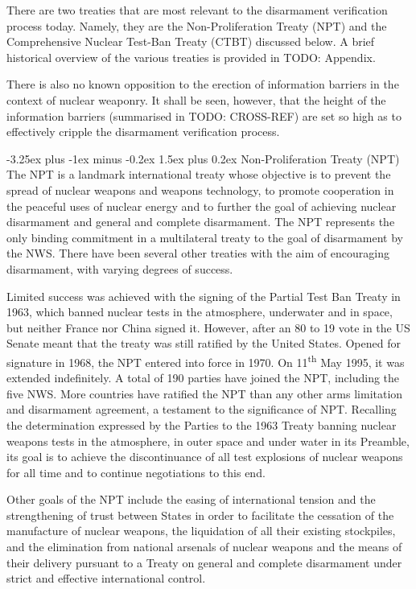 \documentclass[twoside,titlepage,11pt,twocolumn,a4paper]{article}
\makeatletter
\renewcommand{\paragraph}{\@startsection{paragraph}{4}{0ex}%
   {-3.25ex plus -1ex minus -0.2ex}%
   {1.5ex plus 0.2ex}%
   {\normalfont\normalsize\bfseries}}
\makeatother
\begin{document}
There are two treaties that are most relevant to the disarmament
verification process today. Namely, they are the Non-Proliferation
Treaty (NPT) and the Comprehensive Nuclear Test-Ban Treaty (CTBT)
discussed below. A brief historical overview of the various treaties
is provided in TODO: Appendix.

There is also no known opposition to the erection of information
barriers in the context of nuclear weaponry. It shall be seen,
however, that the height of the information barriers (summarised in
TODO: CROSS-REF) are set so high as to effectively cripple the
disarmament verification process.

\paragraph{Non-Proliferation Treaty (NPT)}
The NPT is a landmark international treaty whose objective is to
prevent the spread of nuclear weapons and weapons technology, to
promote cooperation in the peaceful uses of nuclear energy and to
further the goal of achieving nuclear disarmament and general and
complete disarmament. The NPT represents the only binding commitment
in a multilateral treaty to the goal of disarmament by the NWS. There
have been several other treaties with the aim of encouraging
disarmament, with varying degrees of success.

Limited success was achieved with the signing of the Partial Test Ban
Treaty in 1963, which banned nuclear tests in the atmosphere,
underwater and in space, but neither France nor China signed
it. However, after an 80 to 19 vote in the US Senate meant that the
treaty was still ratified by the United States. Opened for signature
in 1968, the NPT entered into force in 1970. On 11\textsuperscript{th}
May 1995, it was extended indefinitely. A total of 190 parties have
joined the NPT, including the five NWS. More countries have ratified
the NPT than any other arms limitation and disarmament agreement, a
testament to the significance of NPT. Recalling the determination
expressed by the Parties to the 1963 Treaty banning nuclear weapons
tests in the atmosphere, in outer space and under water in its
Preamble, its goal is to achieve the discontinuance of all test
explosions of nuclear weapons for all time and to continue
negotiations to this end.

Other goals of the NPT include the easing of international tension and
the strengthening of trust between States in order to facilitate the
cessation of the manufacture of nuclear weapons, the liquidation of
all their existing stockpiles, and the elimination from national
arsenals of nuclear weapons and the means of their delivery pursuant
to a Treaty on general and complete disarmament under strict and
effective international control. \citep{statement2005}
\end{document}
